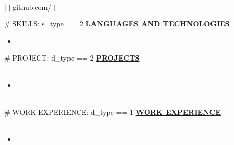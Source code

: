 \documentclass{article}
\begin{document}
\begin{center}
\thispagestyle{empty}
\Large \textbf{ } \\
\normalsize 
    $\mid$  
    $\mid$ github.com/ 
    $\mid$ 
~\\\hrulefill
\end{center}
\#{ SKILLS: s_type == 2 } 
\noindent \textbf{\underline{LANGUAGES AND TECHNOLOGIES}} 
\begin{itemize}[noitemsep,nolistsep,leftmargin=*]
    \item \textbf{} - 
\end{itemize}
\#{ PROJECT: d_type == 2 }              
\noindent \textbf{\underline{PROJECTS}} \\
\noindent \textbf{} \hfill {} - \\
\textit{} %
\begin{itemize}[noitemsep,nolistsep,leftmargin=*]
    \item \textbf{} 
\end{itemize}
        ~\\
\#{ WORK EXPERIENCE: d_type == 1 }
\noindent \textbf{\underline{WORK EXPERIENCE}} \\
\noindent \textbf{} \hfill {} - \\
\textit{} \hfill \textit{} %
\begin{itemize}[noitemsep,nolistsep,leftmargin=*]
    \item \textbf{} 
\end{itemize}
\end{document}
